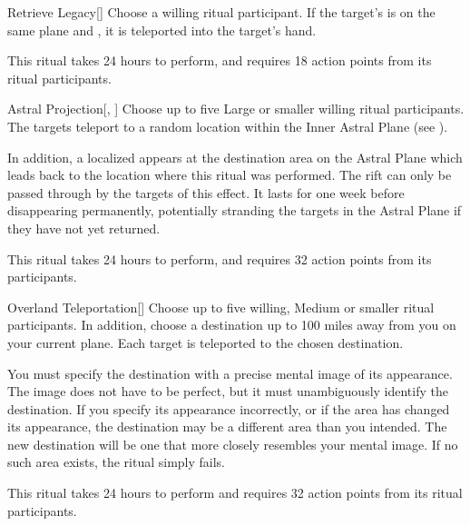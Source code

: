\lowercase{\hypertarget{spell:Retrieve Legacy}{}}\label{spell:Retrieve Legacy}
\begin{apability}[\nth{3}]{\hypertarget{spell:Retrieve Legacy}{Retrieve Legacy}}[]
Choose a willing ritual participant.
If the target's  is on the same plane and , it is teleported into the target's hand.

This ritual takes 24 hours to perform, and requires 18 action points from its ritual participants.
\end{apability}
\vspace{0.25em}



\lowercase{\hypertarget{spell:Astral Projection}{}}\label{spell:Astral Projection}
\begin{apability}[\nth{4}]{\hypertarget{spell:Astral Projection}{Astral Projection}}[, ]
Choose up to five Large or smaller willing ritual participants.
The targets teleport to a random location within the Inner Astral Plane (see ).

In addition, a localized  appears at the destination area on the Astral Plane which leads back to the location where this ritual was performed.
The rift can only be passed through by the targets of this effect.
It lasts for one week before disappearing permanently, potentially stranding the targets in the Astral Plane if they have not yet returned.

This ritual takes 24 hours to perform, and requires 32 action points from its participants.
\end{apability}
\vspace{0.25em}



\lowercase{\hypertarget{spell:Overland Teleportation}{}}\label{spell:Overland Teleportation}
\begin{apability}[\nth{4}]{\hypertarget{spell:Overland Teleportation}{Overland Teleportation}}[]
Choose up to five willing, Medium or smaller ritual participants.
In addition, choose a destination up to 100 miles away from you on your current plane.
Each target is teleported to the chosen destination.

You must specify the destination with a precise mental image of its appearance.
The image does not have to be perfect, but it must unambiguously identify the destination.
If you specify its appearance incorrectly, or if the area has changed its appearance, the destination may be a different area than you intended.
The new destination will be one that more closely resembles your mental image.
If no such area exists, the ritual simply fails.

This ritual takes 24 hours to perform and requires 32 action points from its ritual participants.
\end{apability}
\vspace{0.25em}



